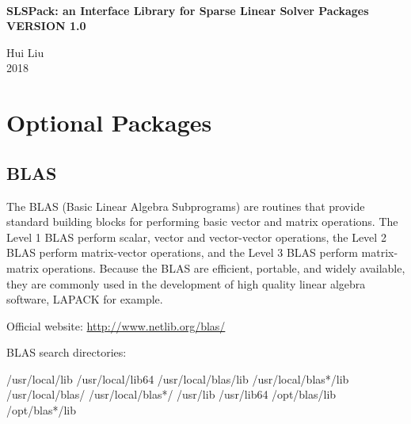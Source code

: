 \documentclass[12pt]{book}
\begin{document}
\begin{titlepage}
\begin{center}

\vspace{5cm}
\begin{spacing}{2.5}
\vspace{5cm}
\textbf{} \\[1.5cm]
\textbf{\Huge SLSPack: an Interface Library for Sparse Linear Solver Packages} \\[0.5cm]
\textbf{VERSION 1.0}
\vspace*{\fill}
\end{spacing}

\begin{spacing}{1.15}
\textnormal{\large Hui Liu \\
    2018}
\end{spacing}
\end{center}
\end{titlepage}

\tableofcontents

\setlength{\parskip}{8pt}

\clearpage
{}








\appendix

\chapter{Optional Packages}

\section{BLAS}
The BLAS (Basic Linear Algebra Subprograms) are routines that provide standard building blocks for performing basic vector and matrix operations. The Level 1 BLAS perform scalar, vector and vector-vector operations, the Level 2 BLAS perform matrix-vector operations, and the Level 3 BLAS perform matrix-matrix operations. Because the BLAS are efficient, portable, and widely available, they are commonly used in the development of high quality linear algebra software, LAPACK for example.

Official website: \url{http://www.netlib.org/blas/}

BLAS search directories:
\begin{evb}
/usr/local/lib
/usr/local/lib64
/usr/local/blas/lib
/usr/local/blas*/lib
/usr/local/blas/
/usr/local/blas*/
/usr/lib
/usr/lib64
/opt/blas/lib
/opt/blas*/lib
\end{evb}
\end{document}
